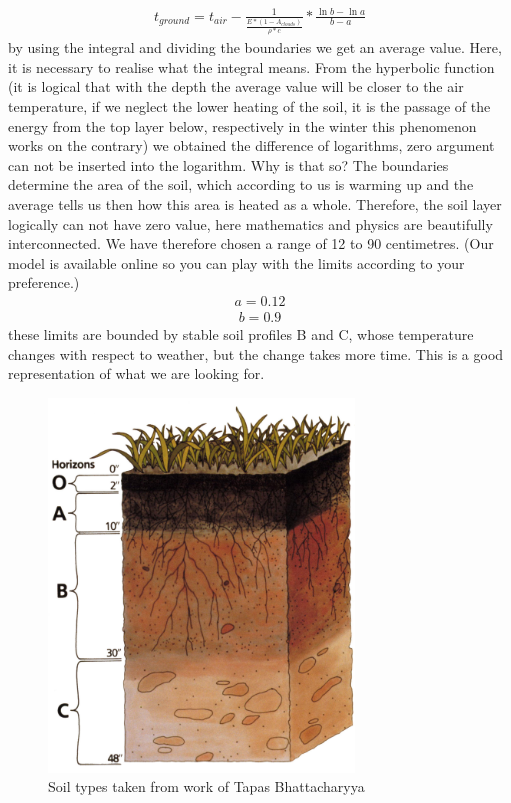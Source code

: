 \documentclass{cfp}
\begin{document}
\begin{align}
t_{ground} =t_{air} - \frac{1}{\frac{E*(1-A_{clouds})}{\rho*c}}*\frac{\ln{b}-\ln{a}}{b-a}
\end{align}
by using the integral and dividing the boundaries we get an average value. Here, it is necessary to realise what the integral means. From the hyperbolic function (it is logical that with the depth the average value will be closer to the air temperature, if we neglect the lower heating of the soil, it is the passage of the energy from the top layer below, respectively in the winter this phenomenon works on the contrary) we obtained the difference of logarithms, zero argument can not be inserted into the logarithm. Why is that so? The boundaries determine the area of the soil, which according to us is warming up and the average tells us then how this area is heated as a whole. Therefore, the soil layer logically can not have zero value, here mathematics and physics are beautifully interconnected. We have therefore chosen a range of 12 to 90 centimetres.
(Our model is available online so you can play with the limits according to your preference.)
\begin{align}
a = 0.12
\end{align}
\begin{align}
b = 0.9
\end{align}
these limits are bounded by stable soil profiles B and C, whose temperature changes with respect to weather, but the change takes more time. This is a good representation of what we are looking for.
\begin{figure}[!h]
\centering
\caption{Soil types taken from work of Tapas Bhattacharyya \cite{Bhattacharyya}}
\includegraphics[width=230pt]{Soil.png}
\end{figure}
\end{document}

